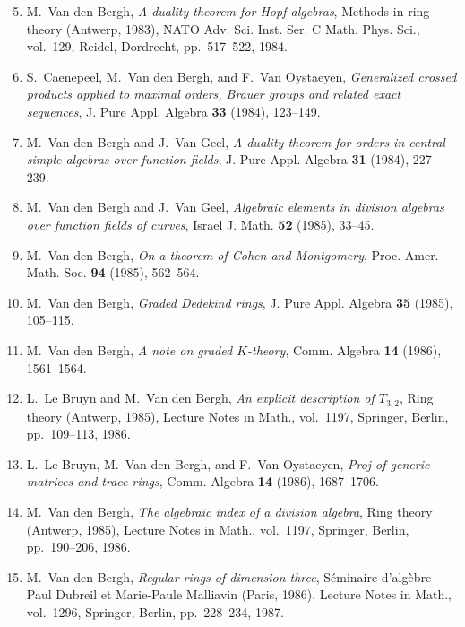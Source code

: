 \begin{enumerate}
\setcounter{enumi}{4}
\item
M.~Van den Bergh, {\em A duality theorem for Hopf algebras}, Methods in ring theory (Antwerp, 1983), NATO Adv. Sci. Inst. Ser. C Math. Phys. Sci., vol.~129, Reidel, Dordrecht, pp.~517--522, 1984.

\item
S.~Caenepeel, M.~Van den Bergh, and F.~Van Oystaeyen, {\em Generalized crossed products applied to maximal orders, Brauer groups and related exact sequences}, J. Pure Appl. Algebra {\bf 33} (1984), 123--149.

\item
M.~Van den Bergh and J.~Van Geel, {\em A duality theorem for orders in central simple algebras over function fields}, J. Pure Appl. Algebra {\bf 31} (1984), 227--239.

\item
M.~Van den Bergh and J.~Van Geel, {\em Algebraic elements in division algebras over function fields of curves}, Israel J. Math. {\bf 52} (1985), 33--45.

\item
M.~Van den Bergh, {\em On a theorem of Cohen and Montgomery}, Proc. Amer. Math. Soc. {\bf 94} (1985), 562--564.

\item
M.~Van den Bergh, {\em Graded Dedekind rings}, J. Pure Appl. Algebra {\bf 35} (1985), 105--115.

\item
M.~Van den Bergh, {\em A note on graded $K$-theory}, Comm. Algebra {\bf 14} (1986), 1561--1564.

\item
L.~Le Bruyn and M.~Van den Bergh, {\em An explicit description of $T_{3,2}$}, Ring theory (Antwerp, 1985), Lecture Notes in Math., vol.~1197, Springer, Berlin, pp.~109--113, 1986.

\item
L.~Le Bruyn, M.~Van den Bergh, and F.~Van Oystaeyen, {\em Proj of generic matrices and trace rings}, Comm. Algebra {\bf 14} (1986), 1687--1706.

\item
M.~Van den Bergh, {\em The algebraic index of a division algebra}, Ring theory (Antwerp, 1985), Lecture Notes in Math., vol.~1197, Springer, Berlin, pp.~190--206, 1986.

\item
M.~Van den Bergh, {\em Regular rings of dimension three}, S\'eminaire d'alg\`ebre Paul Dubreil et Marie-Paule Malliavin (Paris, 1986), Lecture Notes in Math., vol.~1296, Springer, Berlin, pp.~228--234, 1987.


\end{enumerate}
